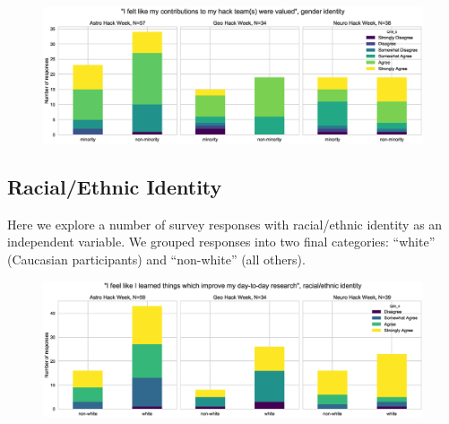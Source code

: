 \documentclass{aastex62}
\begin{document}
\begin{figure}[h!]
\centering
\includegraphics[width=\textwidth]{Q19_5_Q27_stackedbars.eps}
\caption{}
\label{fig:corr8}
\end{figure}

\clearpage

\subsection{Racial/Ethnic Identity}

Here we explore a number of survey responses with racial/ethnic identity as an independent variable. We grouped responses into two final categories: ``white'' (Caucasian participants) and ``non-white'' (all others).

\begin{figure}[h!]
\centering
\includegraphics[width=\textwidth]{Q24_4_Q30_stackedbars.eps}
\caption{}
\label{fig:corr9}
\end{figure}
\end{document}
